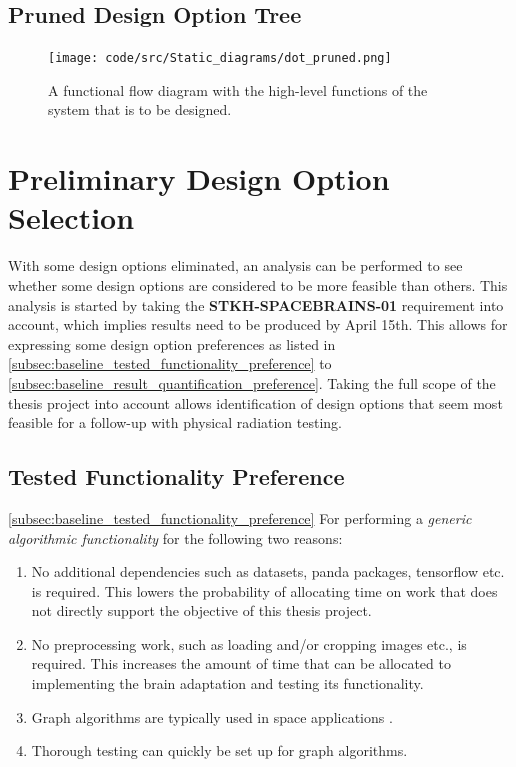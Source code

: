 \subsection{Pruned Design Option Tree}\label{subsec:baseline_pruned_dot}
\begin{figure}[H]
    \centering
    \texttt{[image: code/src/Static\_diagrams/dot\_pruned.png]}
    \caption{A functional flow diagram with the high-level functions of the system that is to be designed.}
    \label{fig:baseline_dot}
\end{figure}


\section{Preliminary Design Option Selection}\label{sec:baseline_preliminary_design_option_selection}
With some design options eliminated, an analysis can be performed to see whether some design options are considered to be more feasible than others. This analysis is started by taking the \textbf{STKH-SPACEBRAINS-01} requirement into account, which implies results need to be produced by April 15th. This allows for expressing some design option preferences as listed in \cref{subsec:baseline_tested_functionality_preference} to \cref{subsec:baseline_result_quantification_preference}. Taking the full scope of the thesis project into account allows identification of design options that seem most feasible for a follow-up with physical radiation testing.

\subsection{Tested Functionality Preference}\cref{subsec:baseline_tested_functionality_preference}
For performing a \textit{generic algorithmic functionality} for the following two reasons:
\begin{enumerate}
    \item No additional dependencies such as datasets, panda packages, tensorflow etc. is required. This lowers the probability of allocating time on work that does not directly support the objective of this thesis project.
    \item No preprocessing work, such as loading and/or cropping images etc.,  is required. This increases the amount of time that can be allocated to implementing the brain adaptation and testing its functionality.
    \item Graph algorithms are typically used in space applications \cite{todo}.%
    \item Thorough testing can quickly be set up for graph algorithms.
\end{enumerate}
 
